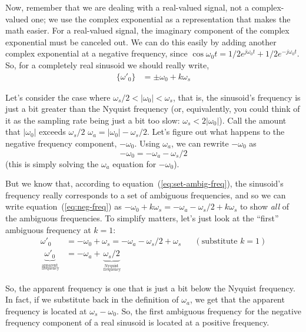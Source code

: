 Now, remember that we are dealing with a real-valued signal, not a
complex-valued one; we use the complex exponential as a representation
that makes the math easier. For a real-valued signal, the imaginary
component of the complex exponential must be canceled out. We can do
this easily by adding another complex exponential at a negative
frequency, since $\cos \omega_0t = 1/2 e^{j\omega_0t} + 1/2
e^{-j\omega_0t}$. So, for a completely real sinusoid we should really write,
\begin{align}
\{\omega'_0\} &= \pm\omega_0 + k\omega_s
\label{eq:set-ambig-freq}
\end{align}

Let's consider the case where $\omega_s/2 < |\omega_0| < \omega_s$,
that is, the sinusoid's frequency is just a bit greater than the
Nyquist frequency (or, equivalently, you could think of it as the
sampling rate being just a bit too slow: $\omega_s <
2|\omega_0|$). Call the amount that $|\omega_0|$ exceeds $\omega_s/2$
$\omega_a = |\omega_0| - \omega_s/2$.  Let's figure out what
happens to the negative frequency component, $-\omega_0$. Using
$\omega_a$, we can rewrite $-\omega_0$ as
\begin{equation}
-\omega_0 = -\omega_a - \omega_s/2
\label{eq:neg-freq}
\end{equation}
(this is simply solving the $\omega_a$ equation for $-\omega_0$).

But we know that, according to equation~(\ref{eq:set-ambig-freq}), the
sinusoid's frequency really corresponds to a set of ambiguous
frequencies, and so we can write equation~(\ref{eq:neg-freq}) as
$-\omega_0 + k\omega_s = -\omega_a - \omega_s/2 + k\omega_s$ to show
\emph{all} of the ambiguous frequencies. To simplify matters, let's
just look at the ``first'' ambiguous frequency at $k=1$:
\begin{align*}
\omega'_0 &= -\omega_0 + \omega_s = -\omega_a- \omega_s/2 + \omega_s
            && (\text{substitute $k=1$}) \\ 
\underbrace{\omega'_0}_{\stackrel{\text{apparent}}{_\text{ frequency}}} &= - \omega_a +
     \underbrace{\omega_s/2}_{\stackrel{\text{Nyquist}}{_\text{ frequency}}}
\end{align*}

So, the apparent frequency is one that is just a bit below the Nyquist
frequency. In fact, if we substitute back in the definition of
$\omega_a$, we get that the apparent frequency is located at $\omega_s
- \omega_0$. So, the first ambiguous frequency for the negative
frequency component of a real sinusoid is located at a positive
frequency.

